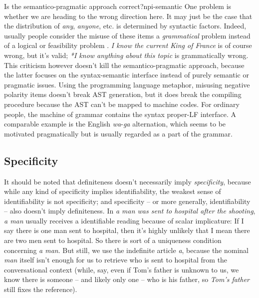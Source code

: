 \documentclass[UTF8, a4paper, oneside, scheme=plain, 12pt]{ctexbook}
\newcommand*{\citepage}[1]{p.~{#1}}
\newcommand{\form}[1]{\emph{#1}}
\begin{document}
\begin{theorybox}{Is the semantico-pragmatic approach correct?}{npi-semantic}
    One problem is whether we are heading to the wrong direction here.
    It may just be the case that the distribution of \form{any}, \form{anyone}, etc. 
    is determined by syntactic factors.
    Indeed, usually people consider the misuse of these items 
    a \emph{grammatical} problem 
    instead of a logical or feasibility problem
    \citep[\citepage{812}]{zeijlstra2013}.
    \form{I know the current King of France} is of course wrong,
    but it's valid;
    \form{*I know anything about this topic} is grammatically wrong.
    This criticism however doesn't kill the semantico-pragmatic approach,
    because the latter focuses on the syntax-semantic interface 
    instead of purely semantic or pragmatic issues.
    Using the programming language metaphor,
    misusing negative polarity items doesn't break AST generation,
    but it does break the compiling procedure
    because the AST can't be mapped to machine codes.
    For ordinary people, the machine of grammar contains the syntax proper-LF interface.
    A comparable example is the English \form{wa}-\form{ga} alternation,
    which seems to be motivated pragmatically 
    but is usually regarded as a part of the grammar.
\end{theorybox}

\subsection{Specificity}\label{sec:np.det.specific}

It should be noted that definiteness doesn't necessarily imply \emph{specificity},
because while any kind of specificity implies identifiability, 
the weakest sense of identifiability 
is not specificity;
and specificity -- or more generally, identifiability -- 
also doesn't imply definiteness.
In \form{a man was sent to hospital after the shooting}, 
\form{a man} usually receives a identifiable reading 
because of scalar implicature: 
If I say there is one man sent to hospital,
then it's highly unlikely that I mean there are two men sent to hospital.
So there is sort of a uniqueness condition concerning \form{a man}.
But still, we use the indefinite article \form{a},
because the nominal \form{man} itself 
isn't enough for us to retrieve who is sent to hospital from the conversational context
(while, say, even if Tom's father is unknown to us,
we know there is someone -- and likely only one -- who is his father,
so \form{Tom's father} still fixes the reference).
\end{document}
